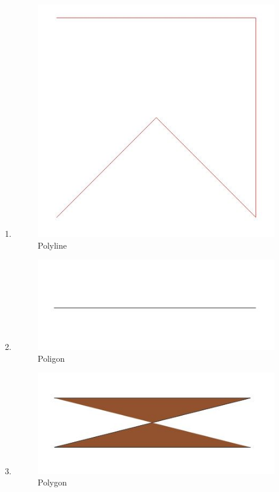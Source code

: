 \begin{enumerate}
	\item 
	
	\begin{figure}[H]
		\includegraphics[width=12cm]{figures/1174042/No5.JPG}
		\centering
		\caption{Polyline}
	\end{figure}
	
	\item 
	
	\begin{figure}[H]
		\includegraphics[width=12cm]{figures/1174042/No6.JPG}
		\centering
		\caption{Poligon}
	\end{figure}
	
	\item 
	
	\begin{figure}[H]
		\includegraphics[width=12cm]{figures/1174042/No7.JPG}
		\centering
		\caption{Polygon}
	\end{figure}
	

\end{enumerate}
